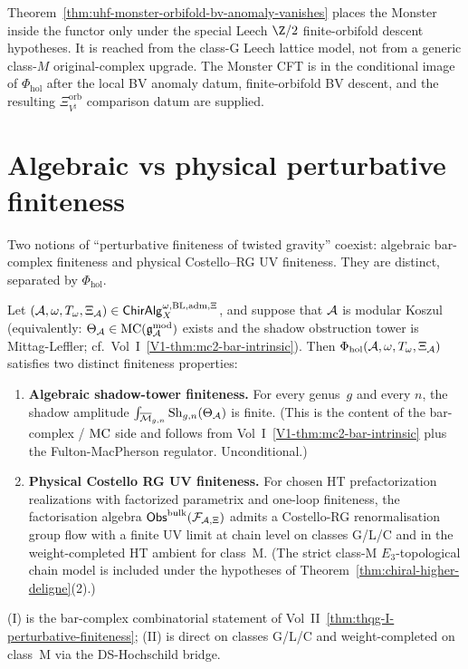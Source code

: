 \begin{remark}
\label{rem:uhf-monster-functor-value}
Theorem~\ref{thm:uhf-monster-orbifold-bv-anomaly-vanishes} places
the Monster inside the functor only under the special Leech $\Z/2$
finite-orbifold descent hypotheses. It is reached from the class-G
Leech lattice model, not from a generic class-$M$ original-complex
upgrade. The Monster CFT is in the conditional image of
$\Phi_{\mathrm{hol}}$ after the local BV anomaly datum,
finite-orbifold BV descent, and the resulting
\(\Xi_{V^\natural}^{\mathrm{orb}}\) comparison datum are supplied.
\end{remark}

\section{Algebraic vs physical perturbative finiteness}
\label{sec:uhf-perturbative-finiteness}

Two notions of ``perturbative finiteness of twisted gravity''
coexist: algebraic bar-complex finiteness and physical
Costello--RG UV finiteness. They are distinct, separated by
$\Phi_{\mathrm{hol}}$.

\begin{theorem}
\label{thm:uhf-perturbative-finiteness-split}
Let
\((\mathcal{A},\omega,T_\omega,\Xi_{\mathcal{A}})\in
\mathsf{ChirAlg}^{\omega,\mathrm{BL,adm},\Xi}_X\), and suppose that
\(\mathcal{A}\) is modular Koszul
(equivalently: $\Theta_{\mathcal{A}} \in \mathrm{MC}(\mathfrak{g}^{\mathrm{mod}}_{\mathcal{A}})$
exists and the shadow obstruction tower is Mittag-Leffler; cf.\
Vol~I~\ref*{V1-thm:mc2-bar-intrinsic}). Then
\(\Phi_{\mathrm{hol}}(\mathcal{A},\omega,T_\omega,\Xi_{\mathcal{A}})\) satisfies two
distinct finiteness properties:
\begin{enumerate}[label=\textup{(\Roman*)}]
\item \textbf{Algebraic shadow-tower finiteness.} For every
 genus~$g$ and every $n$, the shadow amplitude
 $\int_{\overline{\mathcal{M}}_{g,n}} \mathrm{Sh}_{g,n}(\Theta_{\mathcal{A}})$
 is finite. \textup{(}This is the content of the bar-complex /
 $\mathrm{MC}$ side and follows from
 Vol~I~\ref*{V1-thm:mc2-bar-intrinsic} plus the Fulton-MacPherson
 regulator. Unconditional.\textup{)}
\item \textbf{Physical Costello RG UV finiteness.} For chosen HT
 prefactorization realizations with factorized parametrix and
 one-loop finiteness, the factorisation
 algebra $\mathsf{Obs}^{\mathrm{bulk}}(\mathcal{F}_{\mathcal{A},\Xi})$ admits a Costello-RG
	 renormalisation group flow with a finite UV limit at chain
	 level on classes G/L/C and in the weight-completed HT ambient for
	 class~M. \textup{(}The strict class-M $E_3$-topological chain model
	 is included under the hypotheses of
	 Theorem~\ref*{thm:chiral-higher-deligne}(2).\textup{)}
\end{enumerate}
(I) is the bar-complex combinatorial statement of
Vol~II~\ref*{thm:thqg-I-perturbative-finiteness};
(II) is direct on classes G/L/C and weight-completed on class~M via
the DS-Hochschild bridge.
\end{theorem}

